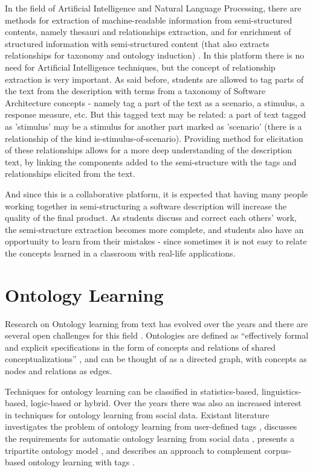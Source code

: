 In the field of Artificial Intelligence and Natural Language Processing, there are methods for extraction of machine-readable information from semi-structured contents, namely thesauri and relationships extraction, and for enrichment of structured information with semi-structured content (that also extracts relationships for taxonomy and ontology induction) \cite{hovy2013collaboratively}. In this platform there is no need for Artificial Intelligence techniques, but the concept of relationship extraction is very important. As said before, students are allowed to tag parts of the text from the description with terms from a taxonomy of Software Architecture concepts - namely tag a part of the text as a scenario, a stimulus, a response measure, etc. But this tagged text may be related: a part of text tagged as 'stimulus' may be a stimulus for another part marked as 'scenario' (there is a relationship of the kind is-stimulus-of-scenario). Providing method for elicitation of these relationships allows for a more deep understanding of the description text, by linking the components added to the semi-structure with the tags and relationships elicited from the text.

And since this is a collaborative platform, it is expected that having many people working together in semi-structuring a software description will increase the quality of the final product. 
As students discuss and correct each others' work, the semi-structure extraction becomes more complete, and students also have an opportunity to learn from their mistakes - since sometimes it is not easy to relate the concepts learned in a classroom with real-life applications.

\section{Ontology Learning}
Research on Ontology learning from text has evolved over the years and there are several open challenges for this field \cite{wong2012ontology}. Ontologies are defined as ``effectively formal and explicit specifications in the form of concepts and relations of shared conceptualizations'' \cite{gruber1993translation}, and can be thought of as a directed graph, with concepts as nodes and relations as edges.
 
Techniques for ontology learning can be classified in statistics-based, linguistics-based, logic-based or hybrid. Over the years there was also an increased interest in techniques for ontology learning from social data. Existant literature investigates the problem of ontology learning from user-defined tags \cite{tang2009towards}, discusses the requirements for automatic ontology learning from social data \cite{kotis2011automated}, presents a tripartite ontology model \cite{mika2007ontologies}, and describes an approach to complement corpus-based ontology learning with tags \cite{weichselbraun2010augmenting}.

